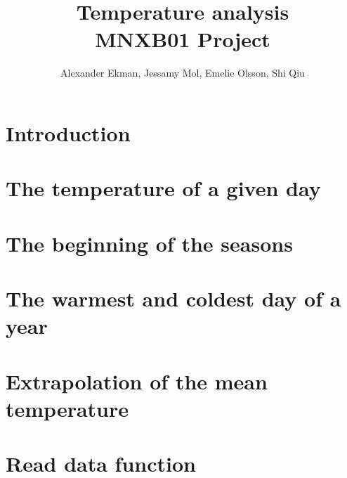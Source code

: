 \documentclass[a4paper]{article}
\title{\textbf{Temperature analysis } \\ 
\vspace{5pt}
\large MNXB01 Project}
\author{Alexander Ekman, Jessamy Mol, Emelie Olsson, Shi Qiu}
\date{ }
\begin{document}
 
 
 

\maketitle

\vspace{-24pt}
\section{Introduction}
 


\section{The temperature of a given day}


\section{The beginning of the seasons}


\section{The warmest and coldest day of a year}


\section{Extrapolation of the mean temperature}


\clearpage
\newpage
\appendix 
\section{Read data function}
\label{appendix}


\newpage


 
\end{document}
